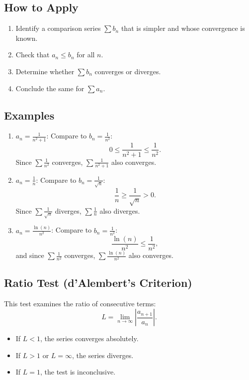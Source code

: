\documentclass[a4paper, 12pt]{article}
\begin{document}
\subsection*{How to Apply}
\begin{enumerate}
    \item Identify a comparison series \(\sum b_n\) that is simpler and whose convergence is known.
    \item Check that \(a_n \leq b_n\) for all \(n\).
    \item Determine whether \(\sum b_n\) converges or diverges.
    \item Conclude the same for \(\sum a_n\).
\end{enumerate}

\subsection*{Examples}
\begin{enumerate}
    \item \(a_n = \frac{1}{n^2 + 1}\): Compare to \(b_n = \frac{1}{n^2}\):
    \[
    0 \leq \frac{1}{n^2 + 1} \leq \frac{1}{n^2}.
    \]
    Since \(\sum \frac{1}{n^2}\) converges, \(\sum \frac{1}{n^2 + 1}\) also converges.

    \item \(a_n = \frac{1}{n}\): Compare to \(b_n = \frac{1}{\sqrt{n}}\):
    \[
    \frac{1}{n} \geq \frac{1}{\sqrt{n}} > 0.
    \]
    Since \(\sum \frac{1}{\sqrt{n}}\) diverges, \(\sum \frac{1}{n}\) also diverges.

    \item \(a_n = \frac{\ln(n)}{n^2}\): Compare to \(b_n = \frac{1}{n^2}\):
    \[
    \frac{\ln(n)}{n^2} \leq \frac{1}{n^2},
    \]
    and since \(\sum \frac{1}{n^2}\) converges, \(\sum \frac{\ln(n)}{n^2}\) also converges.
\end{enumerate}

\subsection{Ratio Test (d'Alembert's Criterion)}
This test examines the ratio of consecutive terms:
\[
L = \lim_{n \to \infty} \left|\frac{a_{n+1}}{a_n}\right|.
\]
\begin{itemize}
    \item If \(L < 1\), the series converges absolutely.
    \item If \(L > 1\) or \(L = \infty\), the series diverges.
    \item If \(L = 1\), the test is inconclusive.
\end{itemize}
\end{document}
